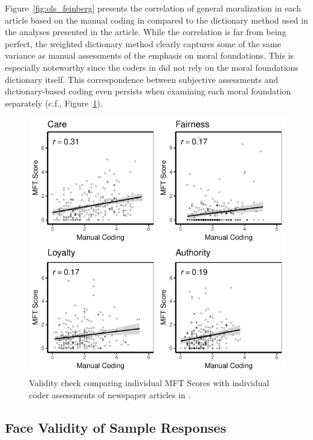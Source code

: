 \documentclass[12pt]{article}
\begin{document}
Figure~\ref{fig:ols_feinberg} presents the correlation of general moralization in each article based on the manual coding in \citet{feinberg2013moral} compared to the dictionary method used in the analyses presented in the article. While the correlation is far from being perfect, the weighted dictionary method clearly captures some of the same variance as manual assessments of the emphasis on moral foundations. This is especially noteworthy since the coders in \citet{feinberg2013moral} did not rely on the moral foundations dictionary itself. This correspondence between subjective assessments and dictionary-based coding even persists when examining each moral foundation separately (c.f., Figure~\ref{fig:ols_feinberg_sep}).


\begin{figure}[ht]\centering
\includegraphics{../calc/fig/feinberg_sep.pdf}
\caption{Validity check comparing individual MFT Scores with individual coder assessments of newspaper articles in \citet{feinberg2013moral}.}\label{fig:ols_feinberg_sep}
\end{figure}



\clearpage

\subsection{Face Validity of Sample Responses}
\end{document}
